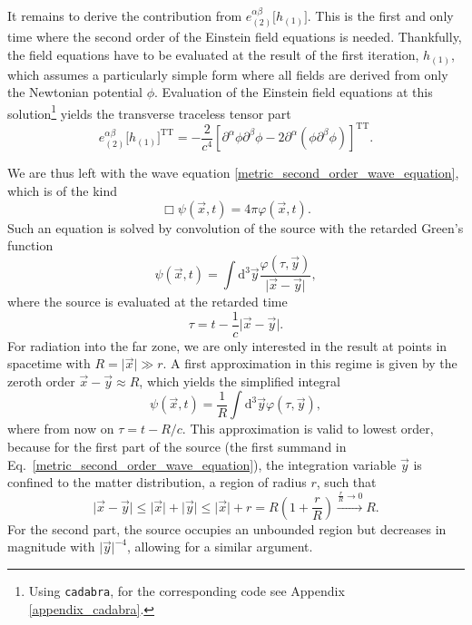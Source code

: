 It remains to derive the contribution from $e^{\alpha\beta}_{(2)}\lbrack h_{(1)}\rbrack$. This is the first and only time where the second order of the Einstein field equations is needed. Thankfully, the field equations have to be evaluated at the result of the first iteration, $h_{(1)}$, which assumes a particularly simple form where all fields are derived from only the Newtonian potential $\phi$. Evaluation of the Einstein field equations at this solution\footnote{Using \texttt{cadabra}, for the corresponding code see Appendix \ref{appendix_cadabra}.} yields the transverse traceless tensor part
\begin{equation}
  e^{\alpha\beta}_{(2)}\lbrack h_{(1)}\rbrack^\text{TT} = -\frac{2}{c^4}\left\lbrack\partial^\alpha\phi\partial^\beta\phi - 2\partial^\alpha(\phi\partial^\beta\phi) \right\rbrack^\text{TT}.
\end{equation}

We are thus left with the wave equation \eqref{metric_second_order_wave_equation}, which is of the kind
\begin{equation}
  \Box\psi(\vec x,t) = 4\pi\varphi(\vec x,t).
\end{equation}
Such an equation is solved by convolution of the source with the retarded Green's function\cite{}
\begin{equation}
  \psi(\vec x,t) = \int\mathrm d^3\vec y\frac{\varphi(\tau,\vec y)}{\lvert\vec x-\vec y\rvert},
\end{equation}
where the source is evaluated at the retarded time
\begin{equation}
  \tau = t - \frac{1}{c}\lvert\vec x-\vec y\rvert.
\end{equation}
For radiation into the far zone, we are only interested in the result at points in spacetime with $R=\lvert\vec x\rvert\gg r$. A first approximation in this regime is given by the zeroth order $\vec x - \vec y \approx R$, which yields the simplified integral
\begin{equation}
  \psi(\vec x,t) = \frac{1}{R}\int\mathrm d^3\vec y\varphi(\tau,\vec y),
\end{equation}
where from now on $\tau = t-R/c$. This approximation is valid to lowest order, because for the first part of the source (the first summand in Eq.~\eqref{metric_second_order_wave_equation}), the integration variable $\vec y$ is confined to the matter distribution, a region of radius $r$, such that
\begin{equation}
  \lvert\vec x-\vec y\rvert \leq \lvert\vec x\rvert + \lvert\vec y\rvert \leq \lvert\vec x\rvert + r = R(1 + \frac{r}{R}) \xrightarrow{\frac{r}{R}\to 0} R.
\end{equation}
For the second part, the source occupies an unbounded region but decreases in magnitude with $\lvert\vec y\rvert^{-4}$, allowing for a similar argument.

